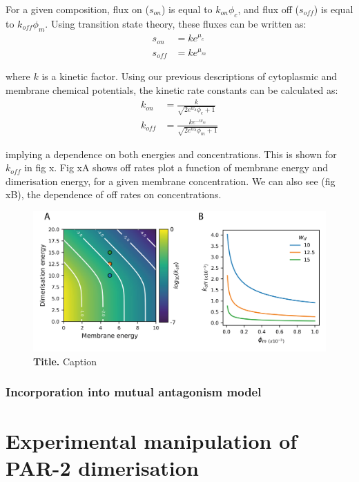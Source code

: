 \documentclass[12pt]{"article"}
\newcommand{\mycaption}[2]{\caption[#1]{\textbf{#1.} #2}}
\begin{document}
For a given composition, flux on ($s_{on}$) is equal to $k_{on}\phi_c$, and flux off ($s_{off}$) is equal to $k_{off}\phi_m$. Using transition state theory, these fluxes can be written as:
\begin{align}
s_{on} &= ke^{\mu_c}\\
s_{off} &= ke^{\mu_m}
\end{align}

where $k$ is a kinetic factor. Using our previous descriptions of cytoplasmic and membrane chemical potentials, the kinetic rate constants can be calculated as:
\begin{align}
k_{on} &= \frac{k}{\sqrt{2e^{w_d}\phi_c+ 1}}\\
k_{off} &= \frac{ke^{-w_m}}{\sqrt{2e^{w_d}\phi_m+ 1}}
\end{align}

implying a dependence on both energies and concentrations. This is shown for $k_{off}$ in fig x. Fig xA shows off rates plot a function of membrane energy and dimerisation energy, for a given membrane concentration. We can also see (fig xB), the dependence of off rates on concentrations.

\begin{figure}[!h]
\includegraphics[scale=1]{thermodynamic_model_koff}
\setlength{\abovecaptionskip}{20pt}
\centering
\mycaption{Title}{Caption}
\label{fig:thermodynamic_model_koff}
\end{figure}

\subsubsection{Incorporation into mutual antagonism model}


\clearpage
\section{Experimental manipulation of PAR-2 dimerisation}
\end{document}
